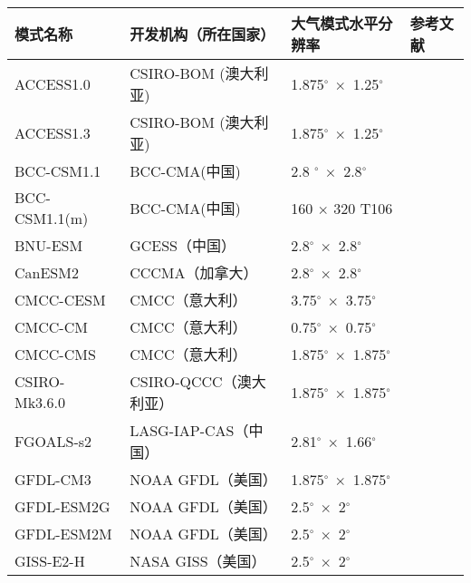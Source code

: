 \begin{table}[!htbp]
    \label{tab:descriptionGCM}
    \centering
    \small%
    \setlength{\tabcolsep}{7 pt}%
    \renewcommand{\arraystretch}{1.0}%
    \begin{tabular}{llll}
        \hline
         模式名称 & 开发机构（所在国家） & 大气模式水平分辨率 & 参考文献 \\
        \hline
        ACCESS1.0 & CSIRO-BOM (澳大利亚) & 1.875$^\circ ~ \times$  1.25$^\circ$ & \citet{dix2013the} \\
        ACCESS1.3 & CSIRO-BOM (澳大利亚) & 1.875$^\circ ~ \times$  1.25$^\circ$ & \citet{dix2013the} \\
        BCC-CSM1.1 & BCC-CMA(中国) & 2.8 $^\circ ~ \times$ 2.8$^\circ$ & \citet{xin2013climate} \\
        BCC-CSM1.1(m) & BCC-CMA(中国) & 160 $\times$ 320 T106 & \citet{liu2015performance} \\
        BNU-ESM & GCESS（中国）& 2.8$^\circ ~ \times$ 2.8$^\circ$  & \citet{ji2014description} \\
        CanESM2 & CCCMA（加拿大） & 2.8$^\circ ~ \times$ 2.8$^\circ$ & \citet{arora2011carbon} \\
        CMCC-CESM & CMCC（意大利） & 3.75$^\circ ~ \times$ 3.75$^\circ$ & \citet{Fogli2009INGV} \\
        CMCC-CM & CMCC（意大利） & 0.75$^\circ ~ \times$ 0.75$^\circ$ & \citet{Fogli2009INGV} \\
        CMCC-CMS & CMCC（意大利）& 1.875$^\circ ~ \times$ 1.875$^\circ$ & \citet{Fogli2009INGV} \\
        CSIRO-Mk3.6.0 & CSIRO-QCCC（澳大利亚）& 1.875$^\circ ~ \times$ 1.875$^\circ$ & \citet{gordon2002csiro} \\
        FGOALS-s2 & LASG-IAP-CAS（中国）& 2.81$^\circ ~ \times$ 1.66$^\circ$ & \citet{bao2013flexible} \\
        GFDL-CM3 & NOAA GFDL（美国） & 1.875$^\circ ~ \times$ 1.875$^\circ$ & \citet{griffies2011gfdl} \\
        GFDL-ESM2G & NOAA GFDL（美国）& 2.5$^\circ ~ \times$ 2$^\circ$ & \citet{dunne2012gfdl,dunne2013gfdl} \\
        GFDL-ESM2M & NOAA GFDL（美国）& 2.5$^\circ ~ \times$ 2$^\circ$ & \citet{dunne2012gfdl,dunne2013gfdl} \\
        GISS-E2-H & NASA GISS（美国）& 2.5$^\circ ~ \times$ 2$^\circ$ & \citet{schmidt2014configuration} \\       
        \hline
	\end{tabular}
\end{table}
